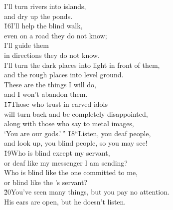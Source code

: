\begin{poetry}
\poeml I'll turn rivers into islands, \\
\poemll    and dry up the ponds. \\
\poeml \v{16}I'll help the blind walk, \\
\poemll    even on a road they do not know; \\
\poeml I'll guide them \\
\poemll    in directions they do not know. \\
\poeml I'll turn the dark places into light in front of them, \\
\poemll    and the rough places into level ground. \\
\poeml These are the things I will do, \\
\poemll    and I won't abandon them. \\
\poeml \v{17}Those who trust in carved idols \\
\poemll    will turn back and be completely disappointed, \\
\poeml along with those who say to metal images, \\
\poemll    `You are our gods.'\,''
\poeml \v{18}``Listen, you deaf people, \\
\poemll    and look up, you blind people, so you may see! \\
\poeml \v{19}Who is blind except my servant, \\
\poemll    or deaf like my messenger I am sending? \\
\poeml Who is blind like the one committed to me, \\
\poemll    or blind like the 's servant? \\
\poeml \v{20}You've seen many things, but you pay no attention. \\
\poemll    His ears are open, but he doesn't listen. \\

\end{poetry}
